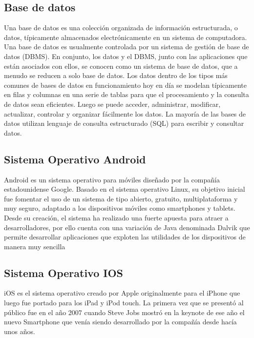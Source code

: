 \documentclass[10pt]{article}
\begin{document}
\subsection{Base de datos}
\justify
Una base de datos es una colección organizada de información estructurada, o datos, típicamente almacenados electrónicamente en un sistema de computadora. Una base de datos es usualmente controlada por un sistema de gestión de base de datos (DBMS). En conjunto, los datos y el DBMS, junto con las aplicaciones que están asociados con ellos, se conocen como un sistema de base de datos, que a menudo se reducen a solo base de datos.
Los datos dentro de los tipos más comunes de bases de datos en funcionamiento hoy en día se modelan típicamente en filas y columnas en una serie de tablas para que el procesamiento y la consulta de datos sean eficientes. Luego se puede acceder, administrar, modificar, actualizar, controlar y organizar fácilmente los datos. La mayoría de las bases de datos utilizan lenguaje de consulta estructurado (SQL) para escribir y consultar datos. \par\vspace{\baselineskip}

\subsection{Sistema Operativo Android}
\justify
Android es un sistema operativo para móviles diseñado por la compañía estadounidense Google. Basado en el sistema operativo Linux, su objetivo inicial fue fomentar el uso de un sistema de tipo abierto, gratuito, multiplataforma y muy seguro, adaptado a los dispositivos móviles como smartphones y tablets. Desde su creación, el sistema ha realizado una fuerte apuesta para atraer a desarrolladores, por ello cuenta con una variación de Java denominada Dalvik que permite desarrollar aplicaciones que exploten las utilidades de los dispositivos de manera muy sencilla
\par\vspace{\baselineskip}


\subsection{Sistema Operativo IOS}
\justify
iOS es el sistema operativo creado por Apple originalmente para el iPhone que luego fue portado para los iPad y iPod touch. La primera vez que se presentó al público fue en el año 2007 cuando Steve Jobs mostró en la keynote de ese año el nuevo Smartphone que venía siendo desarrollado por la compañía desde hacía unos años. \par\vspace{\baselineskip}
\end{document}
